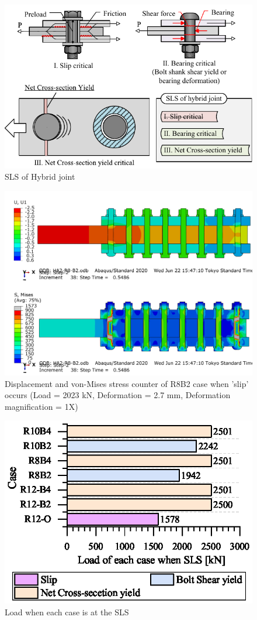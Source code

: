 \begin{figure}[htbp]
    \centering
    \includegraphics[width=0.9\linewidth]{imgs/ch5/slsofhybridj.pdf}
    \caption{SLS of Hybrid joint}
    \label{fig-slsofhj}
\end{figure}

\begin{figure}[htbp]
    \centering
    \includegraphics[width=0.9\linewidth]{imgs/ch5/R8B2slip.png}
    \caption{Displacement and von-Mises stress counter of R8B2 case when 'slip' occurs (Load = 2023 kN, Deformation = 2.7 mm, Deformation magnification = 1X)}
    \label{figc-R8B2slip}
\end{figure}

\begin{figure}[htbp]
    \centering
    \includegraphics[width=0.65\linewidth]{imgs/ch5/P-SLS.eps}
    \caption{Load when each case is at the SLS}
    \label{fig-PSLS}
\end{figure}


